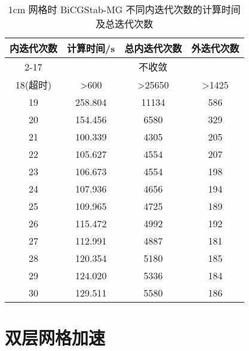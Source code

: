 \begin{datasheet}
\begin{table}
\centering
\caption{1cm 网格时 BiCGStab-MG 不同内迭代次数的计算时间及总迭代次数}
\label{tab:equsolve.iter.bicgstab-mg.1cm}
\begin{tabular}{cccc}
\toprule
内迭代次数 & 计算时间/s & 总内迭代次数 & 外迭代次数\\
\midrule
2-17 & \multicolumn{3}{c}{不收敛} \\ %
18(超时) & >600 & >25650 & >1425 \\ %
19 & 258.804 & 11134 & 586\\
20 & 154.456 & 6580 & 329\\
21 & 100.339 & 4305 & 205\\
22 & 105.627 & 4554 & 207\\
23 & 106.673 & 4554 & 198\\
24 & 107.936 & 4656 & 194\\
25 & 109.965 & 4725 & 189\\
26 & 115.472 & 4992 & 192\\
27 & 112.991 & 4887 & 181\\
28 & 120.354 & 5180 & 185\\
29 & 124.020 & 5336 & 184\\
30 & 129.511 & 5580 & 186\\
\bottomrule
\end{tabular}
\end{table}

\end{datasheet}




\section{双层网格加速}
\label{sec:equsolve.multimesh}
